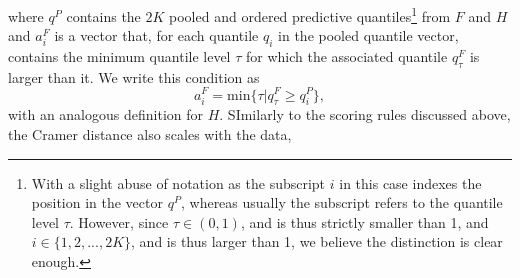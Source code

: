 where $q^P$ contains the $2K$ pooled and ordered predictive quantiles\footnote{With a slight abuse of notation as the subscript $i$ in this case indexes the position in the vector $q^P$, whereas usually the subscript refers to the quantile level $\tau$. However, since $\tau \in (0,1)$, and is thus strictly smaller than 1, and $i \in \{1,2,...,2K\}$, and is thus larger than 1, we believe the distinction is clear enough.} from $F$ and $H$ and $a_i^F$ is a vector that, for each quantile $q_i$ in the pooled quantile vector, contains the minimum quantile level $\tau$ for which the associated quantile $q_\tau^F$ is larger than it. We write this condition as
\begin{equation*}
a_i^F = \text{min}\{\tau | q_\tau^F \geq q_i^P\},
\end{equation*}
with an analogous definition for $H$. SImilarly to the scoring rules discussed above, the Cramer distance also scales with the data,
